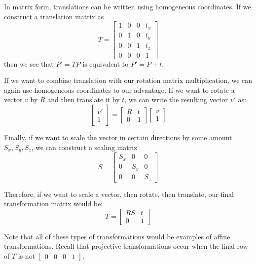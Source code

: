 \documentclass[a4paper, 12pt]{article}
\begin{document}
In matrix form, translations can be written using homogeneous coordinates. If we construct a translation matrix as
\[ T = \begin{bmatrix}
1 & 0 & 0 & t_x \\0 & 1 & 0 & t_y \\0 & 0 & 1 & t_z \\ 0 & 0 & 0 & 1
\end{bmatrix}\]
then we see that $P'=TP$ is equivalent to $P' = P+t$.


If we want to combine translation with our rotation matrix multiplication, we can again use homogeneous coordinates to our advantage. If we want to rotate a vector $v$ by $R$ and then translate it by $t$, we can write the resulting vector $v'$ as:
\[ \begin{bmatrix}v'\\1\end{bmatrix} = \begin{bmatrix}
R & t \\ 0 & 1
\end{bmatrix}\begin{bmatrix}
v \\ 1
\end{bmatrix}\]

Finally, if we want to scale the vector in certain directions by some amount $S_x, S_y, S_z$, we can construct a scaling matrix 
\[S = \begin{bmatrix}
S_x & 0 & 0 \\ 0 & S_y & 0 \\ 0 & 0 & S_z
\end{bmatrix}\]

Therefore, if we want to scale a vector, then rotate, then translate, our final transformation matrix would be:
\[T = \begin{bmatrix}
RS & t \\ 0 & 1
\end{bmatrix}\]

Note that all of these types of transformations would be examples of affine transformations. Recall that projective transformations occur when the final row of $T$ is not $\begin{bmatrix}
0 & 0 &0 &1
\end{bmatrix}$.
\end{document}
